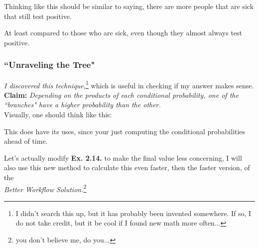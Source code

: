 \documentclass[12pt]{book}
\begin{document}
Thinking like this should be similar to saying, there are more people that are sick that still test positive.

At least compared to those who are sick, even though they almost always test positive.

\subsubsection{\textbf{``Unraveling the Tree"}}
\textit{I discovered this technique,}\footnote{I didn't search this up, but it has probably been invented somewhere. If so, I do not take credit, but it be cool if I found new math more often...} which is useful in checking if my answer makes sense.\newpage
\textbf{Claim: }\textit{Depending on the products of each conditional probability, one of the ``branches" have a higher probability than the other.}\\
Visually, one should think like this:
\begin{center}
\end{center}

This does have its uses, since your just computing the conditional probabilities ahead of time. 

Let's actually modify \textbf{Ex. 2.14.} to make the final value less concerning, I will also use this new method to calculate this even faster, then the faster version, of the\\
\textit{Better Workflow Solution.}\footnote{you don't believe me, do you...}\\
\end{document}
